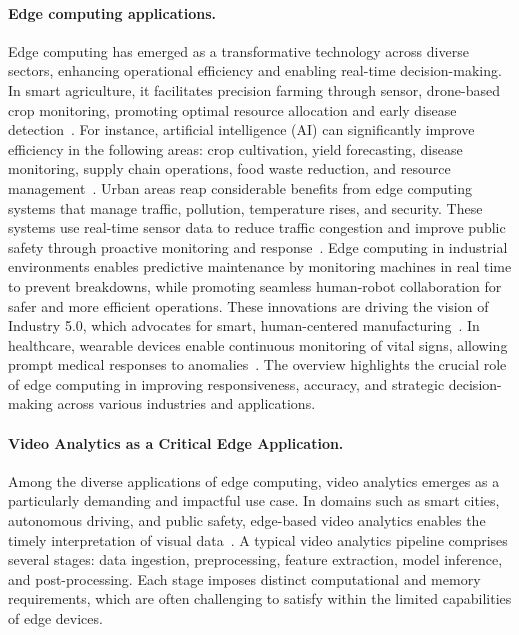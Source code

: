 \paragraph{Edge computing applications.}
Edge computing has emerged as a transformative technology across diverse sectors, enhancing operational efficiency and enabling real-time decision-making. In smart agriculture, it facilitates precision farming through sensor, drone-based crop monitoring, promoting optimal resource allocation and early disease detection~\cite{akhtar2021smart,junaidi2025deep,dhifaoui2022cloud}. For instance, artificial intelligence (AI) can significantly improve efficiency in the following areas: crop cultivation, yield forecasting, disease monitoring, supply chain operations, food waste reduction, and resource management~\cite{pandey2024towards}.
Urban areas reap considerable benefits from edge computing systems that manage traffic, pollution, temperature rises, and security. These systems use real-time sensor data to reduce traffic congestion and improve public safety through proactive monitoring and response~\cite{xu2023mobile,hossain2018edge}.
Edge computing in industrial environments enables predictive maintenance by monitoring machines in real time to prevent breakdowns, while promoting seamless human-robot collaboration for safer and more efficient operations. These innovations are driving the vision of Industry 5.0, which advocates for smart, human-centered manufacturing~\cite{sharma2024edge}.
In healthcare, wearable devices enable continuous monitoring of vital signs, allowing prompt medical responses to anomalies~\cite{rancea2024edge}. The overview highlights the crucial role of edge computing in improving responsiveness, accuracy, and strategic decision-making across various industries and applications.

\paragraph{Video Analytics as a Critical Edge Application.}
Among the diverse applications of edge computing, video analytics emerges as a particularly demanding and impactful use case. In domains such as smart cities, autonomous driving, and public safety, edge-based video analytics enables the timely interpretation of visual data~\cite{hu2023edge,xu2023edge}. A typical video analytics pipeline comprises several stages: data ingestion, preprocessing, feature extraction, model inference, and post-processing. Each stage imposes distinct computational and memory requirements, which are often challenging to satisfy within the limited capabilities of edge devices.

